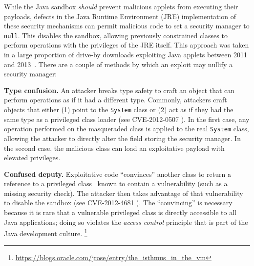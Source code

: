 \documentclass{sig-alternate}
\begin{document}
%
While the Java sandbox \textit{should} prevent malicious applets from
executing their payloads, defects in the
Java Runtime Environment (JRE) implementation of these security mechanisms can permit
malicious code to set a security manager to \texttt{null}.  
This disables the sandbox, allowing
previously constrained classes to perform operations with the privileges of 
the JRE itself. 
This approach was taken in a large proportion of drive-by downloads exploiting
Java applets between 2011 and 2013~\cite{fireeye_2013}. 
%
There are a couple of methods by which an exploit may nullify a security manager:

\noindent\textbf{Type confusion.} An attacker breaks type
safety to craft an object that can perform operations as if it had
a different type. Commonly, attackers craft objects that either
(1) point to the \texttt{System} class or (2) act as if they had
the same type as a privileged class loader (see CVE-2012-0507 \cite{_vulnerability_2012_0507}).
In the first case, any operation performed on the
masqueraded class is applied to the real \texttt{System} class, allowing
the attacker to directly alter the field storing the security manager. 
In the second case, the malicious class can load an exploitative
payload with elevated privileges.

\noindent\textbf{Confused deputy.} Exploitative code ``convinces'' another
class to return a reference to a privileged class~\cite{hardy_confused_1988}
known to contain a vulnerability (such as a missing security check).  The
attacker then takes advantage of that vulnerability to disable the sandbox 
(see CVE-2012-4681 \cite{_vulnerability_2012_4681}).
The ``convincing'' is necessary
because it is rare that a vulnerable privileged class is directly accessible
to all Java applications; doing so violates the \textit{access
control} principle that is part of the Java development culture.%
\footnote{\url{https://blogs.oracle.com/jrose/entry/the_isthmus_in_the_vm}%
} 
\end{document}
